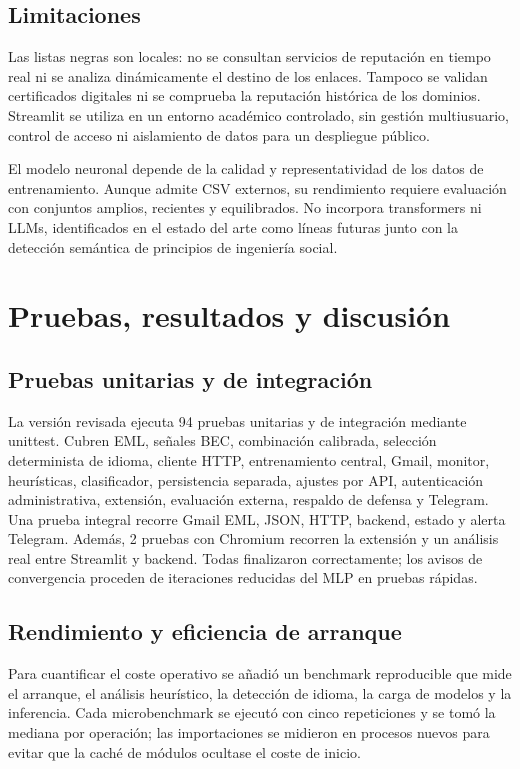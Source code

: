\documentclass[11pt,a4paper,oneside]{report}
\begin{document}


\section{Limitaciones}

Las listas negras son locales: no se consultan servicios de reputación en tiempo real ni se analiza dinámicamente el destino de los enlaces. Tampoco se validan certificados digitales ni se comprueba la reputación histórica de los dominios. Streamlit se utiliza en un entorno académico controlado, sin gestión multiusuario, control de acceso ni aislamiento de datos para un despliegue público.

El modelo neuronal depende de la calidad y representatividad de los datos de entrenamiento. Aunque admite CSV externos, su rendimiento requiere evaluación con conjuntos amplios, recientes y equilibrados. No incorpora transformers ni LLMs, identificados en el estado del arte como líneas futuras junto con la detección semántica de principios de ingeniería social.

\chapter{Pruebas, resultados y discusión}

\section{Pruebas unitarias y de integración}

La versión revisada ejecuta 94 pruebas unitarias y de integración mediante unittest. Cubren EML, señales BEC, combinación calibrada, selección determinista de idioma, cliente HTTP, entrenamiento central, Gmail, monitor, heurísticas, clasificador, persistencia separada, ajustes por API, autenticación administrativa, extensión, evaluación externa, respaldo de defensa y Telegram. Una prueba integral recorre Gmail EML, JSON, HTTP, backend, estado y alerta Telegram. Además, 2 pruebas con Chromium recorren la extensión y un análisis real entre Streamlit y backend. Todas finalizaron correctamente; los avisos de convergencia proceden de iteraciones reducidas del MLP en pruebas rápidas.

\section{Rendimiento y eficiencia de arranque}

Para cuantificar el coste operativo se añadió un benchmark reproducible que mide el arranque, el análisis heurístico, la detección de idioma, la carga de modelos y la inferencia. Cada microbenchmark se ejecutó con cinco repeticiones y se tomó la mediana por operación; las importaciones se midieron en procesos nuevos para evitar que la caché de módulos ocultase el coste de inicio.
\end{document}

